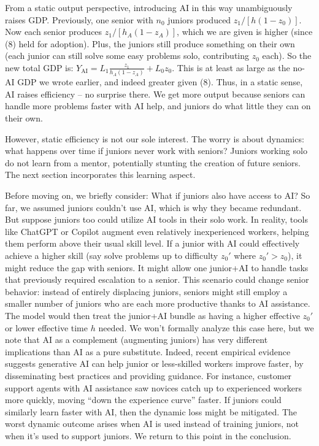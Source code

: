 \documentclass[12pt]{article}
\begin{document}
From a {static output} perspective, introducing AI in this way
unambiguously {raises GDP}. Previously, one senior with \(n_0\)
juniors produced \(z_1/[h(1-z_0)]\). Now each senior produces
\(z_1/[h_A(1-z_A)]\), which we are given is higher (since (8) held for
adoption). Plus, the juniors still produce something on their own (each
junior can still solve some easy problems solo, contributing \(z_0\)
each). So the new total GDP is:
\(Y_{\text{AI}} = L_1 \frac{z_1}{h_A(1-z_A)} + L_0  z_0.\) This is
{at least as large as} the no-AI GDP we wrote earlier, and indeed
greater given (8). Thus, in a static sense, AI raises efficiency -- no
surprise there. We get {more output} because seniors can handle
more problems faster with AI help, and juniors do what little they can
on their own.

However, static efficiency is not our sole interest. {The worry
is about dynamics: what happens over time if juniors never work with
seniors?} Juniors working solo do not learn from a mentor, potentially
stunting the creation of future seniors. The next section incorporates
this learning aspect.

Before moving on, we briefly consider: {What if juniors also have
access to AI?} So far, we assumed juniors couldn't use AI, which is why
they became redundant. But suppose juniors too could utilize AI tools in
their solo work. In reality, tools like ChatGPT or Copilot {augment
even relatively inexperienced workers}, helping them perform above their
usual skill level. If a junior with AI could effectively achieve a
higher skill (say solve problems up to difficulty \(z_0'\) where
\(z_0' > z_0\)), it might reduce the gap with seniors. It might allow
one junior+AI to handle tasks that previously required escalation to a
senior. This scenario could {change senior behavior}: instead of
entirely displacing juniors, seniors might still employ a smaller number
of juniors who are each more productive thanks to AI assistance. The
model would then treat the junior+AI bundle as having a higher effective
\(z_0'\) or lower effective time \(h\) needed. We won't formally analyze
this case here, but we note that {AI as a complement (augmenting
juniors)} has very different implications than AI as a pure substitute.
Indeed, recent empirical evidence suggests generative AI can {help
junior or less-skilled workers improve faster}, by disseminating best
practices and providing guidance. For instance, customer support agents
with AI assistance saw novices catch up to experienced workers more
quickly, moving ``down the experience curve'' faster. If juniors could
similarly learn faster with AI, then the dynamic loss might be
mitigated. The worst dynamic outcome arises when AI is {used
instead of training juniors}, not when it's used to support juniors. We
return to this point in the conclusion.
\end{document}

